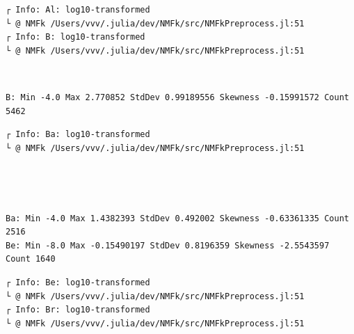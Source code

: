 \documentclass[11pt]{article}
\begin{document}
    \begin{Verbatim}[commandchars=\\\{\}]
┌ Info: Al: log10-transformed
└ @ NMFk /Users/vvv/.julia/dev/NMFk/src/NMFkPreprocess.jl:51
┌ Info: B: log10-transformed
└ @ NMFk /Users/vvv/.julia/dev/NMFk/src/NMFkPreprocess.jl:51
    \end{Verbatim}

    \begin{center}
    \end{center}
    { \hspace*{\fill} \\}
    
    \begin{Verbatim}[commandchars=\\\{\}]
B: Min -4.0 Max 2.770852 StdDev 0.99189556 Skewness -0.15991572 Count 5462
    \end{Verbatim}

    \begin{Verbatim}[commandchars=\\\{\}]
┌ Info: Ba: log10-transformed
└ @ NMFk /Users/vvv/.julia/dev/NMFk/src/NMFkPreprocess.jl:51
    \end{Verbatim}

    \begin{center}
    \end{center}
    { \hspace*{\fill} \\}
    
    \begin{center}
    \end{center}
    { \hspace*{\fill} \\}
    
    \begin{Verbatim}[commandchars=\\\{\}]
Ba: Min -4.0 Max 1.4382393 StdDev 0.492002 Skewness -0.63361335 Count 2516
Be: Min -8.0 Max -0.15490197 StdDev 0.8196359 Skewness -2.5543597 Count 1640
    \end{Verbatim}

    \begin{Verbatim}[commandchars=\\\{\}]
┌ Info: Be: log10-transformed
└ @ NMFk /Users/vvv/.julia/dev/NMFk/src/NMFkPreprocess.jl:51
┌ Info: Br: log10-transformed
└ @ NMFk /Users/vvv/.julia/dev/NMFk/src/NMFkPreprocess.jl:51
    \end{Verbatim}
\end{document}
